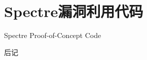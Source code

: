 \documentclass[degree=undergraduate,bibstyle=numerical,font=empty]{xmuthesis}
\begin{document}
\maketitle


\xmutableofcontents %




\nocite{*} 

\appendix
\chapter{Spectre漏洞利用代码}{Spectre Proof-of-Concept Code} \label{app:spectre-code}

\backmatter
后记
\end{document}
